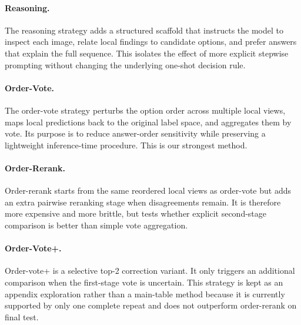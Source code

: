 \documentclass[11pt]{article}
\begin{document}
\paragraph{Reasoning.}
The reasoning strategy adds a structured scaffold that instructs the model to inspect each image, relate local findings to candidate options, and prefer answers that explain the full sequence. This isolates the effect of more explicit stepwise prompting without changing the underlying one-shot decision rule.

\paragraph{Order-Vote.}
The order-vote strategy perturbs the option order across multiple local views, maps local predictions back to the original label space, and aggregates them by vote. Its purpose is to reduce answer-order sensitivity while preserving a lightweight inference-time procedure. This is our strongest method.

\paragraph{Order-Rerank.}
Order-rerank starts from the same reordered local views as order-vote but adds an extra pairwise reranking stage when disagreements remain. It is therefore more expensive and more brittle, but tests whether explicit second-stage comparison is better than simple vote aggregation.

\paragraph{Order-Vote+.}
Order-vote+ is a selective top-2 correction variant. It only triggers an additional comparison when the first-stage vote is uncertain. This strategy is kept as an appendix exploration rather than a main-table method because it is currently supported by only one complete repeat and does not outperform order-rerank on final test.
\end{document}
